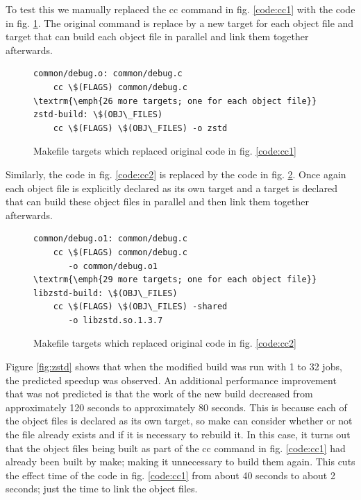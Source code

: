 \documentclass[sigconf,10pt,authorversion]{acmart}\settopmatter{printfolios=true,printccs=false,printacmref=false}
\begin{document}
To test this we manually replaced the cc command in fig. \ref{code:cc1} with the code in fig.
\ref{code:cc3}.  The original command is replace by a new target for each object file and target
that can build each object file in parallel and link them together afterwards.

\begin{figure}[H]
\begin{Verbatim}[commandchars=\\\{\},codes={\catcode`$=3\catcode`^=7\catcode`_=8},fontsize=\small]
common/debug.o: common/debug.c                                                       
    cc \$(FLAGS) common/debug.c
\textrm{\emph{26 more targets; one for each object file}}    
zstd-build: \$(OBJ\_FILES)
    cc \$(FLAGS) \$(OBJ\_FILES) -o zstd
\end{Verbatim}
\caption{Makefile targets which replaced original code in fig. \ref{code:cc1}}
\label{code:cc3}
\end{figure}

Similarly, the code in fig. \ref{code:cc2} is replaced by the code in fig. \ref{code:cc4}.  Once
again each object file is explicitly declared as its own target and a target is declared that can
build these object files in parallel and then link them together afterwards.

\begin{figure}[H]
  \begin{Verbatim}[commandchars=\\\{\},codes={\catcode`$=3\catcode`^=7\catcode`_=8},fontsize=\small]
common/debug.o1: common/debug.c
    cc \$(FLAGS) common/debug.c
       -o common/debug.o1
\textrm{\emph{29 more targets; one for each object file}}
libzstd-build: \$(OBJ\_FILES)
    cc \$(FLAGS) \$(OBJ\_FILES) -shared
       -o libzstd.so.1.3.7
\end{Verbatim}
\caption{Makefile targets which replaced original code in fig. \ref{code:cc2}}
\label{code:cc4}
\end{figure}

Figure \ref{fig:zstd} shows that when the modified build was run with 1 to 32 jobs,
the predicted speedup was observed.  An additional performance improvement that was not predicted
is that the work of the new build decreased from approximately 120 seconds to approximately 80 seconds.
This is because each of the object files is declared as its own target, so make can consider whether
or not the file already exists and if it is necessary to rebuild it.  In this case, it turns out that
the object files being built as part of the cc command in fig. \ref{code:cc1} had already been built
by make; making it unnecessary to build them again.  This cuts the effect time of the code in fig.
\ref{code:cc1} from about 40 seconds to about 2 seconds; just the time to link the object files.
\end{document}
